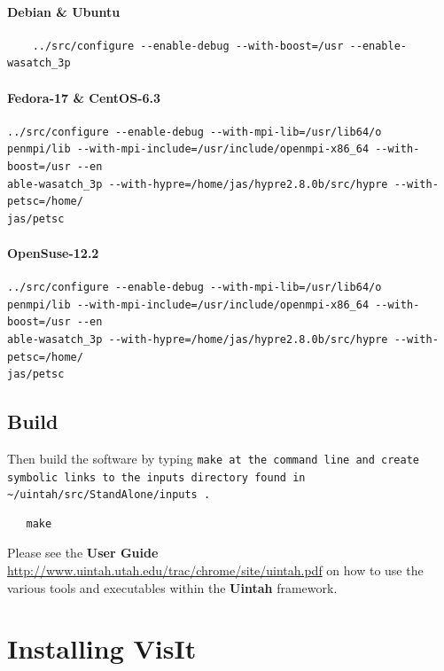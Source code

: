 \documentclass[12pt]{article}
\newcommand{\TT}[1]{\tt{#1} \normalfont}
\begin{document}
\paragraph{Debian & Ubuntu}

\begin{verbatim}
    ../src/configure --enable-debug --with-boost=/usr --enable-wasatch_3p
\end{verbatim}

\paragraph{Fedora-17 & CentOS-6.3}

\begin{verbatim}
../src/configure --enable-debug --with-mpi-lib=/usr/lib64/o
penmpi/lib --with-mpi-include=/usr/include/openmpi-x86_64 --with-boost=/usr --en
able-wasatch_3p --with-hypre=/home/jas/hypre2.8.0b/src/hypre --with-petsc=/home/
jas/petsc
\end{verbatim}

\paragraph{OpenSuse-12.2}

\begin{verbatim}
../src/configure --enable-debug --with-mpi-lib=/usr/lib64/o
penmpi/lib --with-mpi-include=/usr/include/openmpi-x86_64 --with-boost=/usr --en
able-wasatch_3p --with-hypre=/home/jas/hypre2.8.0b/src/hypre --with-petsc=/home/
jas/petsc
\end{verbatim}

\subsection{Build}

Then build the software by typing \TT{make} at the command line and create symbolic links to the inputs directory found in \TT{\textasciitilde/uintah/src/StandAlone/inputs}.
\begin{verbatim}
   make
\end{verbatim}


Please see the \textbf{User Guide}
\url{http://www.uintah.utah.edu/trac/chrome/site/uintah.pdf} on how to use
the various tools and executables within the \textbf{Uintah}
framework.


\section{Installing VisIt}
\end{document}
